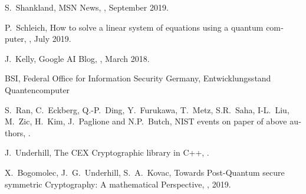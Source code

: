 \documentclass[a4paper,11pt]{article}
\begin{document}
\begin{otherlanguage}{english}
\begin{thebibliography}{1}
  S.~Shankland,
  \newblock MSN News,
  , September 2019.

  P.~Schleich,
  \newblock How to solve a linear system of equations using a quantum computer,
  , July 2019.

  J.~Kelly,
  \newblock Google AI Blog,
  , March 2018.

BSI, Federal Office for Information Security Germany,
  \newblock Entwicklungsstand Quantencomputer

  S.~Ran, C.~Eckberg, Q.-P.~Ding, Y.~Furukawa, T.~Metz, S.R.~Saha, I-L.~Liu, M.~Zic, H.~Kim, J.~Paglione and N.P.~Butch,
  \newblock NIST events on paper of above authors,
  .

J.~Underhill,
  \newblock The CEX Cryptographic library in C++,
  .

X.~Bogomolec, J.~G.~Underhill, S.~A.~Kovac,
  \newblock Towards Post-Quantum secure symmetric Cryptography: 
A mathematical Perspective,  
  , 2019.


  
\end{thebibliography}



\end{otherlanguage}
\end{document}
